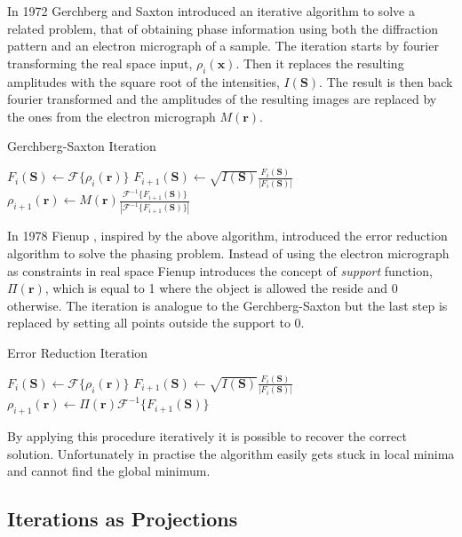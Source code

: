 In 1972 Gerchberg and Saxton \cite{Gerchberg72} introduced an iterative algorithm to solve
a related problem, that of obtaining phase information using both the
diffraction pattern and an electron micrograph of a sample. The iteration starts
by fourier transforming the real space input, $\rho_i(\mathbf x)$. Then it
replaces the resulting amplitudes with the square root of the intensities,
$I(\mathbf S)$. The result is then back fourier transformed and the amplitudes
of the resulting images are replaced by the ones from the electron micrograph $M(\mathbf r)$.
\begin{algorithm}
\caption{Gerchberg-Saxton Iteration}
\begin{algorithmic}
  \STATE $F_{i}(\mathbf S) \gets \mathscr{F}\{\rho_i(\mathbf r)\}$
  \STATE $F_{i+1}(\mathbf S) \gets \sqrt{I(\mathbf S)} \frac{F_i(\mathbf S)}{|F_i(\mathbf S)|}$
  \STATE $\rho_{i+1}(\mathbf r) \gets M(\mathbf r)
  \frac{\mathscr{F}^{-1}\{F_{i+1}(\mathbf
    S)\}}{|\mathscr{F}^{-1}\{F_{i+1}(\mathbf S)\}|}$
\end{algorithmic}
\end{algorithm}

In 1978 Fienup \cite{Fienup78}, inspired by the above algorithm, introduced the error
reduction algorithm to solve the phasing problem. Instead of using the electron
micrograph as constraints in real space Fienup introduces the concept of {\em
  support} function, $\Pi(\mathbf r)$, which is equal to 1 where the
object is allowed the reside and 0 otherwise. 
The iteration is analogue to the Gerchberg-Saxton but the last step is replaced
by setting all points outside the support to 0.
\begin{algorithm}
\caption{Error Reduction Iteration}
\begin{algorithmic}
  \STATE $F_{i}(\mathbf S) \gets \mathscr{F}\{\rho_i(\mathbf r)\}$
  \STATE $F_{i+1}(\mathbf S) \gets \sqrt{I(\mathbf S)} \frac{F_i(\mathbf S)}{|F_i(\mathbf S)|}$
  \STATE $\rho_{i+1}(\mathbf r) \gets \Pi(\mathbf r) \mathscr{F}^{-1}\{F_{i+1}(\mathbf S)\}$
\end{algorithmic}
\end{algorithm}

By applying this procedure iteratively it is possible to recover the correct
solution. Unfortunately in practise the algorithm easily gets stuck in
local minima and cannot find the global minimum.

\subsection{Iterations as Projections}

